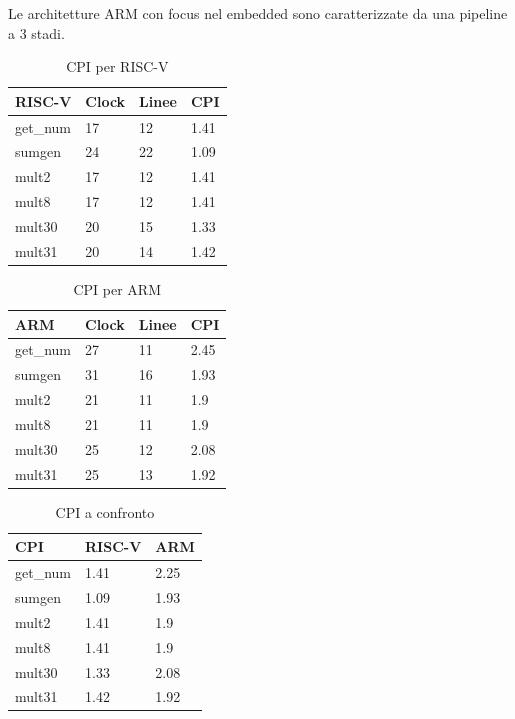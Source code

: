 \documentclass[12pt, a4paper]{report}
\begin{document}
%
Le architetture ARM con focus nel embedded sono caratterizzate da una pipeline a 3 stadi. 

\begin{table}[ht]
\centering
\begin{tabular}{|l|l|l|l|}
\hline
RISC-V   & Clock & Linee & CPI  \\ \hline
get\_num & 17    & 12    & 1.41 \\ \hline
sumgen   & 24    & 22    & 1.09 \\ \hline
mult2    & 17    & 12    & 1.41 \\ \hline
mult8    & 17    & 12    & 1.41 \\ \hline
mult30   & 20    & 15    & 1.33 \\ \hline
mult31   & 20    & 14    & 1.42 \\ \hline
\end{tabular}
\caption{CPI per RISC-V}
\label{tab:CPI_RISCV}
\end{table}

\begin{table}[ht]
\centering
\begin{tabular}{|l|l|l|l|}
\hline
ARM  & Clock & Linee & CPI  \\ \hline
get\_num & 27    & 11    & 2.45 \\ \hline
sumgen   & 31    & 16    & 1.93 \\ \hline
mult2    & 21    & 11    & 1.9  \\ \hline
mult8    & 21    & 11    & 1.9  \\ \hline
mult30   & 25    & 12    & 2.08 \\ \hline
mult31   & 25    & 13    & 1.92 \\ \hline
\end{tabular}
\caption{CPI per ARM}
\label{tab:CPI_ARM}
\end{table}

\begin{table}[ht]
\centering
\begin{tabular}{|l|l|l|}
\hline
CPI  & RISC-V & ARM   \\ \hline
get\_num & 1.41 & 2.25     \\ \hline
sumgen   & 1.09 & 1.93     \\ \hline
mult2    & 1.41 & 1.9      \\ \hline
mult8    & 1.41 & 1.9      \\ \hline
mult30   & 1.33 & 2.08   \\ \hline
mult31   & 1.42 & 1.92  \\ \hline
\end{tabular}
\caption{CPI a confronto}
\label{tab:CPI_RISC-V_ARM}
\end{table}
\end{document}
